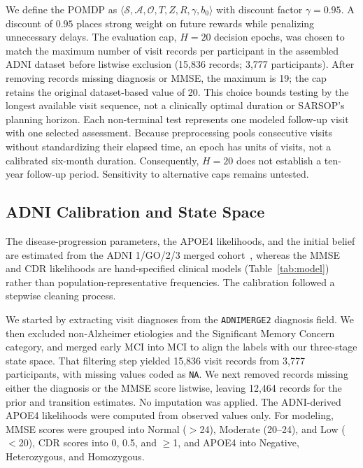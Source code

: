 \documentclass[conference,a4paper]{IEEEtran}
\begin{document}
We define the POMDP as $\langle \mathcal{S}, \mathcal{A}, \mathcal{O},
T, Z, R, \gamma, b_0 \rangle$ with discount factor $\gamma = 0.95$.
A discount of $0.95$ places strong weight on future rewards while
penalizing unnecessary delays.
The evaluation cap, $H=20$ decision epochs, was chosen to match the
maximum number of visit records per participant in the assembled ADNI
dataset before listwise exclusion (15,836 records; 3,777 participants).
After removing records missing diagnosis or MMSE, the maximum is 19;
the cap retains the original dataset-based value of 20.
This choice bounds testing by the longest available visit sequence,
not a clinically optimal duration or SARSOP's planning horizon.
Each non-terminal test represents one modeled follow-up visit with
one selected assessment. Because preprocessing pools consecutive
visits without standardizing their elapsed time, an epoch has units
of visits, not a calibrated six-month duration. Consequently, $H=20$
does not establish a ten-year follow-up period. Sensitivity to
alternative caps remains untested.

\subsection{ADNI Calibration and State Space}

The disease-progression parameters, the APOE4 likelihoods, and the
initial belief are estimated from the ADNI 1/GO/2/3 merged
cohort~\cite{petersen2010adni,jack2008adni,mueller2005adni}, whereas the
MMSE and CDR likelihoods are hand-specified clinical models
(Table~\ref{tab:model}) rather than population-representative
frequencies. The calibration followed a stepwise cleaning process.

We started by extracting visit diagnoses from the \texttt{ADNIMERGE2}
diagnosis field. We then excluded non-Alzheimer etiologies and the
Significant Memory Concern category, and merged early MCI into MCI
to align the labels with our three-stage state space. That filtering
step yielded 15,836 visit records from 3,777 participants, with missing values coded as \texttt{NA}. We next
removed records missing either the diagnosis or the MMSE score
listwise, leaving 12,464 records for the prior and transition
estimates. No imputation was applied. The ADNI-derived APOE4
likelihoods were computed from observed values only. For modeling, MMSE scores
were grouped into Normal ($>$24), Moderate (20--24), and Low ($<$20),
CDR scores into 0, 0.5, and $\geq$1, and APOE4 into Negative,
Heterozygous, and Homozygous.
\end{document}
